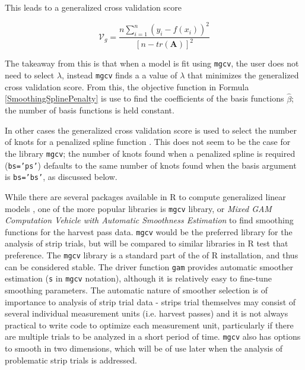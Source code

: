 \documentclass[phdcss]{SDSUThesis}
\begin{document}
This leads to a generalized cross validation score

\begin{equation}\label{GeneralizedCrossValidation}
\mathcal{V}_g = \frac{n\sum_{i=1}^n (y_i - f(x_i))^2}{[n-tr(\mathbf{A})]^2}
\end{equation}

The takeaway from this is that when a model is fit using \texttt{mgcv}, the user does not need to select $\lambda$, instead \texttt{mgcv} finds a a value of $\lambda$ that minimizes the generalized cross validation score. From this, the objective function in Formula  \ref{SmoothingSplinePenalty} is use to find the coefficients of the basis functions $\widehat{\beta}$; the number of basis functions is held constant.

In other cases the generalized cross validation score is used to select the number of knots for a penalized spline function \cite{friedman-02-1989, ruppert-01-2002}. This does not seem to be the case for the library \texttt{mgcv}; the number of knots found when a penalized spline is required (\texttt{bs='ps'}) defaults to the same number of knots found when the basis argument is \texttt{bs='bs'}, as discussed below.




 
While there are several packages available in R to compute generalized linear models \cite{perperoglou-2019}, one of the more popular libraries is \texttt{mgcv} library, or \textit{Mixed GAM Computation Vehicle with Automatic Smoothness Estimation} \cite{wood-2017} to find smoothing functions for the harvest pass data. \texttt{mgcv} would be the preferred library for the analysis of strip trials, but will be compared to similar libraries in R test that preference. The \texttt{mgcv} library is a standard part of the of R installation, and thus can be considered stable. The driver function \texttt{gam} provides automatic smoother estimation (\texttt{s} in \texttt{mgcv} notation), although it is relatively easy to fine-tune smoothing parameters. The automatic nature of smoother selection is of importance to analysis of strip trial data - strips trial themselves may consist of several individual measurement units (i.e. harvest passes) and it is not always practical to write code to optimize each measurement unit, particularly if there are multiple trials to be analyzed in a short period of time. \texttt{mgcv} also has options to smooth in two dimensions, which will be of use later when the analysis of problematic strip trials is addressed. 
\end{document}
